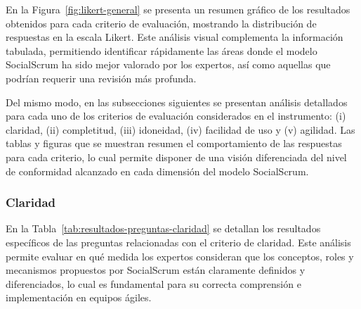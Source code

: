 En la Figura~\ref{fig:likert-general} se presenta un resumen gráfico de los resultados obtenidos para cada criterio de evaluación, mostrando la distribución de respuestas en la escala Likert. Este análisis visual complementa la información tabulada, permitiendo identificar rápidamente las áreas donde el modelo SocialScrum ha sido mejor valorado por los expertos, así como aquellas que podrían requerir una revisión más profunda.



Del mismo modo, en las subsecciones siguientes se presentan análisis detallados para cada uno de los criterios de evaluación considerados en el instrumento: (i) claridad, (ii) completitud, (iii) idoneidad, (iv) facilidad de uso y (v) agilidad. Las tablas y figuras que se muestran resumen el comportamiento de las respuestas para cada criterio, lo cual permite disponer de una visión diferenciada del nivel de conformidad alcanzado en cada dimensión del modelo SocialScrum.

\subsubsection{Claridad}

En la Tabla~\ref{tab:resultados-preguntas-claridad} se detallan los resultados específicos de las preguntas relacionadas con el criterio de claridad. Este análisis permite evaluar en qué medida los expertos consideran que los conceptos, roles y mecanismos propuestos por SocialScrum están claramente definidos y diferenciados, lo cual es fundamental para su correcta comprensión e implementación en equipos ágiles.

\begingroup
\scriptsize
\renewcommand{\arraystretch}{1.4}
\setlength{\tabcolsep}{4pt}
\setlength{\LTleft}{0pt}
\setlength{\LTright}{0pt}

